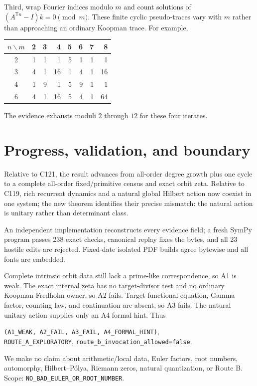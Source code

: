 \documentclass[10pt]{article}
\begin{document}
Third, wrap Fourier indices modulo $m$ and count solutions of
$(A^{\mathsf Tn}-I)k=0\pmod m$.  These finite cyclic pseudo-traces vary with
$m$ rather than approaching an ordinary Koopman trace.  For example,
\begin{center}
\scriptsize
\begin{tabular}{@{}c*{7}{r}@{}}
\toprule
$n\backslash m$&2&3&4&5&6&7&8\\ \midrule
2&1&1&1&5&1&1&1\\
3&4&1&16&1&4&1&16\\
4&1&9&1&5&9&1&1\\
6&4&1&16&5&4&1&64\\
\bottomrule
\end{tabular}
\end{center}
The evidence exhausts moduli $2$ through $12$ for these four iterates.

\section{Progress, validation, and boundary}
Relative to C121, the result advances from all-order degree growth plus one
cycle to a complete all-order fixed/primitive census and exact orbit zeta.
Relative to C119, rich recurrent dynamics and a natural global Hilbert action
now coexist in one system; the new theorem identifies their precise mismatch:
the natural action is unitary rather than determinant class.

An independent implementation reconstructs every evidence field; a fresh
SymPy program passes 238 exact checks, canonical replay fixes the bytes, and
all 23 hostile edits are rejected.  Fixed-date isolated PDF builds agree
bytewise and all fonts are embedded.

Complete intrinsic orbit data still lack a prime-like correspondence, so A1
is weak.  The exact internal zeta has no target-divisor test and no ordinary
Koopman Fredholm owner, so A2 fails.  Target functional equation, Gamma
factor, counting law, and continuation are absent, so A3 fails.  The natural
unitary action supplies only an A4 formal hint.  Thus
\begin{center}
\texttt{(A1\_WEAK, A2\_FAIL, A3\_FAIL, A4\_FORMAL\_HINT)},\\
\texttt{ROUTE\_A\_EXPLORATORY},\quad
\texttt{route\_b\_invocation\_allowed=false}.
\end{center}
We make no claim about arithmetic/local data, Euler factors, root numbers,
automorphy, Hilbert--P\'olya, Riemann zeros, natural quantization, or Route B.
Scope: \texttt{NO\_BAD\_EULER\_OR\_ROOT\_NUMBER}.
\end{document}
